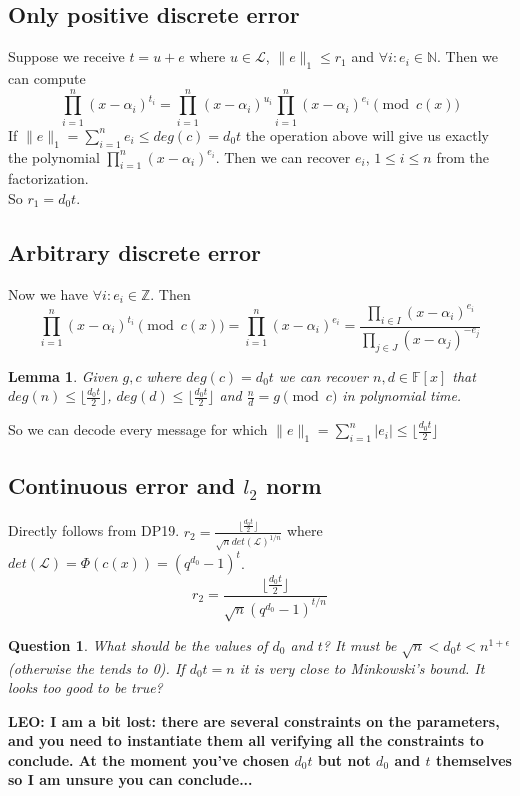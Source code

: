 \documentclass[12pt]{article}
\newcommand{\floor}[1]{\lfloor #1 \rfloor}
\newtheorem{question}{Question}
\newtheorem{lemma}{Lemma}
\begin{document}
\subsection{Only positive discrete error}
Suppose we receive $t = u + e$ where $u \in \mathcal{L}$, $\|e\|_1 \leq r_1$ and $\forall i: e_i \in \mathbb{N}$. Then we can compute 
\begin{equation}
\prod_{i = 1}^{n}(x - \alpha_i)^{t_i} = \prod_{i = 1}^{n}(x - \alpha_i)^{u_i}\prod_{i = 1}^{n}(x - \alpha_i)^{e_i} \pmod{c(x)}
\end{equation}
If $\|e\|_1 = \sum_{i =1}^{n} e_i \leq deg(c) = d_0t$ the operation above will give us exactly the polynomial $\prod_{i = 1}^{n}(x - \alpha_i)^{e_i}$. Then we can recover $e_i$, $1 \leq i \leq n$ from the factorization.\\
So $r_1 = d_0t$.
\subsection{Arbitrary discrete error}
Now we have $\forall i: e_i \in \mathbb{Z}$. Then
\begin{equation}
\prod_{i = 1}^{n}(x - \alpha_i)^{t_i} \pmod{c(x)} = \prod_{i = 1}^{n}(x - \alpha_i)^{e_i} = \frac{\prod_{i \in I}(x - \alpha_i)^{e_i}}{\prod_{j \in J}(x - \alpha_j)^{-e_j}}
\end{equation}
\begin{lemma}
Given $g,c$ where $deg(c) = d_0t$ we can recover $n, d \in \mathbb{F}[x]$ that $deg(n) \leq \floor{\frac{d_0t}{2}}$, $deg(d) \leq \floor{\frac{d_0t}{2}}$ and $\frac{n}{d} = g \pmod{c}$ in polynomial time.
\end{lemma}
So we can decode every message for which $\|e\|_1 = \sum_{i =1}^{n} |e_i| \leq \floor{\frac{d_0t}{2}}$

\subsection{Continuous error and $l_2$ norm}
Directly follows from DP19. $r_2 = \frac{\floor{\frac{d_0t}{2}}}{\sqrt{n} det(\mathcal{L})^{1/n}}$ where $det(\mathcal{L}) = \Phi(c(x)) = (q^{d_0} - 1)^{t}$.
\begin{equation}
r_2 = \frac{\floor{\frac{d_0t}{2}}}{\sqrt{n} (q^{d_0} - 1)^{t/n}}
\end{equation}
\begin{question}
What should be the values of $d_0$ and $t$? It must be $\sqrt{n} < d_0t < n^{1+\epsilon}$(otherwise the tends to 0). If $d_0t = n$ it is very close to Minkowski's bound. It looks too good to be true? 
\end{question}
{\bf LEO: I am a bit lost: there are several constraints on the parameters, and you need to instantiate them all verifying all the constraints to conclude. At the moment you've chosen $d_0t$ but not $d_0$ and $t$ themselves so I am unsure you can conclude...}
\end{document}
